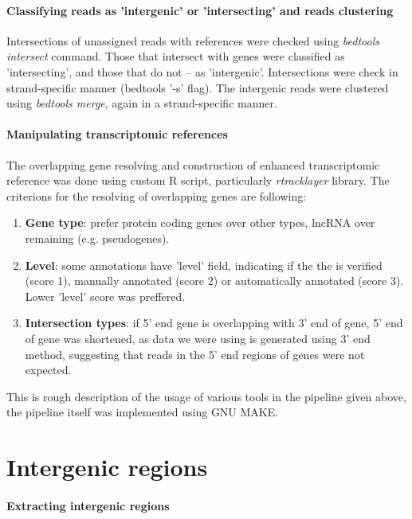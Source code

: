 \paragraph{Classifying reads as 'intergenic' or 'intersecting' and reads clustering}
Intersections of unassigned reads with references were checked using \textit{bedtools intersect} command.
Those that intersect with genes were classified as 'intersecting', and those that do not – as 'intergenic'.
Intersections were check in strand-specific manner (bedtools '-s' flag).
The intergenic reads were clustered using \textit{bedtools merge}, again in a strand-specific manner.

\paragraph{Manipulating transcriptomic references}
The overlapping gene resolving and construction of enhanced transcriptomic reference was done using custom R script,
particularly \textit{rtracklayer} library.
The criterions for the resolving of overlapping genes are following:
\begin{enumerate}
  \item \textbf{Gene type}: prefer protein coding genes over other types, lncRNA over remaining (e.g. pseudogenes).
  \item \textbf{Level}: some annotations have 'level' field, indicating if the the is verified (score 1), manually annotated (score 2)
  or automatically annotated (score 3). Lower 'level' score was preffered.
  \item \textbf{Intersection types}: if 5' end gene is overlapping with 3' end of gene, 5' end of gene was shortened,
  as data we were using is generated using 3' end method, suggesting that reads in the 5' end regions of genes were not expected.
\end{enumerate}

This is rough description of the usage of various tools in the pipeline given above, the pipeline itself was implemented using GNU MAKE.

\section{Intergenic regions}

\paragraph{Extracting intergenic regions}

